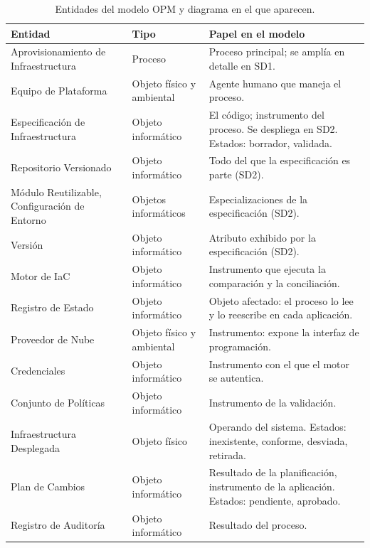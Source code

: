 \documentclass[11pt,letterpaper]{article}
\begin{document}
\begin{table}[ht]
  \centering
  \scriptsize
  \caption{Entidades del modelo OPM y diagrama en el que aparecen.}
  \label{tab:entidades}
  \begin{tabularx}{\textwidth}{@{}>{\raggedright\arraybackslash}p{}
    >{\raggedright\arraybackslash}p{}
    >{\raggedright\arraybackslash}X@{}}
    \toprule
    \textbf{Entidad} & \textbf{Tipo} & \textbf{Papel en el modelo} \\
    \midrule
    Aprovisionamiento de Infraestructura & Proceso & Proceso principal; se
      amplía en detalle en SD1. \\
    Equipo de Plataforma & Objeto físico y ambiental & Agente humano que
      maneja el proceso. \\
    Especificación de Infraestructura & Objeto informático & El código;
      instrumento del proceso. Se despliega en SD2. Estados: borrador,
      validada. \\
    Repositorio Versionado & Objeto informático & Todo del que la
      especificación es parte (SD2). \\
    Módulo Reutilizable, Configuración de Entorno & Objetos informáticos &
      Especializaciones de la especificación (SD2). \\
    Versión & Objeto informático & Atributo exhibido por la especificación
      (SD2). \\
    Motor de IaC & Objeto informático & Instrumento que ejecuta la
      comparación y la conciliación. \\
    Registro de Estado & Objeto informático & Objeto afectado: el proceso lo
      lee y lo reescribe en cada aplicación. \\
    Proveedor de Nube & Objeto físico y ambiental & Instrumento: expone la
      interfaz de programación. \\
    Credenciales & Objeto informático & Instrumento con el que el motor se
      autentica. \\
    Conjunto de Políticas & Objeto informático & Instrumento de la
      validación. \\
    Infraestructura Desplegada & Objeto físico & Operando del sistema.
      Estados: inexistente, conforme, desviada, retirada. \\
    Plan de Cambios & Objeto informático & Resultado de la planificación,
      instrumento de la aplicación. Estados: pendiente, aprobado. \\
    Registro de Auditoría & Objeto informático & Resultado del proceso. \\
    \bottomrule
  \end{tabularx}
\end{table}
\end{document}
